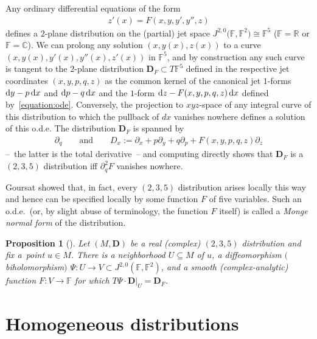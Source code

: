 \documentclass[10pt,a4paper]{amsart}
\newcommand{\bbC}{\mathbb{C}}
\newcommand{\bbF}{\mathbb{F}}
\newcommand{\bbR}{\mathbb{R}}
\newcommand{\mbD}{\mathbf{D}}
\numberwithin{equation}{section}
\newtheorem{Proposition}[Theorem]{Proposition}
\begin{document}
Any ordinary differential equations of the form
\begin{gather}\label{equation:ode}
	z'(x) = F(x, y, y', y'', z)
\end{gather}
defines a $2$-plane distribution on the (partial) jet space $J^{2, 0}\big(\bbF, \bbF^2\big) \cong \bbF^5$ ($\bbF = \bbR$ or $\bbF = \bbC$). We can prolong any solution $(x, y(x), z(x))$ to a curve $(x, y(x), y'(x), y''(x), z'(x))$ in $\bbF^5$, and by construction any such curve is tangent to the $2$-plane distribution $\mbD_F \subset T \bbF^5$ defined in the respective jet coordinates $(x, y, p, q, z)$ as the common kernel of the canonical jet $1$-forms ${\rm d}y - p \,{\rm d}x$ and ${\rm d}p - q \,{\rm d}x$ and the $1$-form ${\rm d}z - F(x, y, p, q, z) \,{\rm d}x$ defined by~\eqref{equation:ode}. Conversely, the projection to $xyz$-space of any integral curve of this distribution to which the pullback of $dx$ vanishes nowhere defines a solution of this o.d.e. The distribution $\mbD_F$ is spanned by
\begin{gather*}
	\partial_q
		\qquad \textrm{and} \qquad
	D_x := \partial_x + p \partial_y + q \partial_p + F(x, y, p, q, z) \partial_z
\end{gather*}
--~the latter is the total derivative~-- and computing directly shows that $\mbD_F$ is a $(2, 3, 5)$ distribution iff $\partial_q^2 F$ vanishes nowhere.

Goursat showed that, in fact, every $(2, 3, 5)$ distribution arises locally this way and hence can be specified locally by some function $F$ of five variables. Such an o.d.e.\ (or, by slight abuse of terminology, the function $F$ itself) is called a \textit{Monge normal form} of the distribution.
\begin{Proposition}[{\cite[Section~76]{Goursat}}]
Let $(M, \mbD)$ be a real (complex) $(2, 3, 5)$ distribution and fix a~point $u \in M$. There is a neighborhood $U \subseteq M$ of $u$, a diffeomorphism $($biholomorphism$)$ $\Psi\colon U \to V \subset J^{2, 0}(\bbF, \bbF^2)$, and a smooth (complex-analytic) function $F\colon V \to \bbF$ for which $T\Psi \cdot \mbD\vert_U = \mbD_F$.
\end{Proposition}

\section{Homogeneous distributions}
\end{document}
